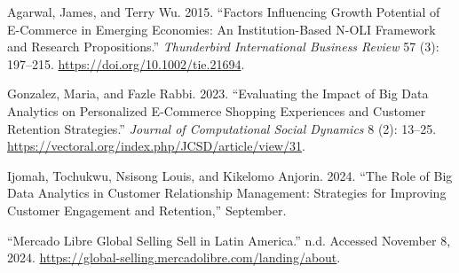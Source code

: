 \documentclass{article}
\newlength{\cslhangindent}
\newenvironment{CSLReferences}[2] %
 {\begin{list}{}{%
  \setlength{\itemindent}{0pt}
  \setlength{\leftmargin}{0pt}
  \setlength{\parsep}{0pt}
  \ifodd #1
   \setlength{\leftmargin}{\cslhangindent}
   \setlength{\itemindent}{-1\cslhangindent}
  \fi
  \setlength{\itemsep}{#2\baselineskip}}}
 {\end{list}}
\begin{document}
\label{refs}
\begin{CSLReferences}{1}{0}
Agarwal, James, and Terry Wu. 2015. {``Factors {Influencing} {Growth}
{Potential} of {E}-{Commerce} in {Emerging} {Economies}: {An}
{Institution}-{Based} {N}-{OLI} {Framework} and {Research}
{Propositions}.''} \emph{Thunderbird International Business Review} 57
(3): 197--215. \url{https://doi.org/10.1002/tie.21694}.

Gonzalez, Maria, and Fazle Rabbi. 2023. {``Evaluating the {Impact} of
{Big} {Data} {Analytics} on {Personalized} {E}-Commerce {Shopping}
{Experiences} and {Customer} {Retention} {Strategies}.''} \emph{Journal
of Computational Social Dynamics} 8 (2): 13--25.
\url{https://vectoral.org/index.php/JCSD/article/view/31}.

Ijomah, Tochukwu, Nsisong Louis, and Kikelomo Anjorin. 2024. {``The Role
of Big Data Analytics in Customer Relationship Management: {Strategies}
for Improving Customer Engagement and Retention,''} September.

{``Mercado {Libre} {Global} {Selling} {\textbar} {Sell} in {Latin}
{America}.''} n.d. Accessed November 8, 2024.
\url{https://global-selling.mercadolibre.com/landing/about}.

\end{CSLReferences}



\end{document}
